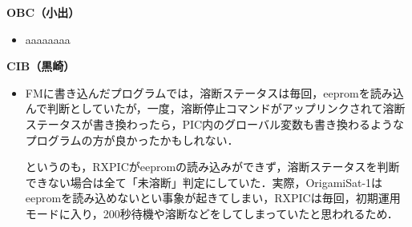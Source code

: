 \hspace{2ex}
\textbf{OBC（小出）}
\begin{itemize}
	\item aaaaaaaa
\end{itemize}

\hspace{2ex}
\textbf{CIB（黒崎）}
\begin{itemize}
	\item FMに書き込んだプログラムでは，溶断ステータスは毎回，eepromを読み込んで判断としていたが，一度，溶断停止コマンドがアップリンクされて溶断ステータスが書き換わったら，PIC内のグローバル変数も書き換わるようなプログラムの方が良かったかもしれない．
	
	というのも，RXPICがeepromの読み込みができず，溶断ステータスを判断できない場合は全て「未溶断」判定にしていた．実際，OrigamiSat-1はeepromを読み込めないとい事象が起きてしまい，RXPICは毎回，初期運用モードに入り，200秒待機や溶断などをしてしまっていたと思われるため．
\end{itemize}